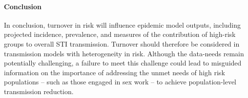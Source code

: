 \paragraph{Conclusion}
In conclusion, turnover in risk will influence
epidemic model outputs, including projected incidence, prevalence, and
measures of the contribution of high-risk groups to overall STI transmission.
Turnover should therefore be considered in
transmission models with heterogeneity in risk.
Although the data-needs remain potentially challenging,
a failure to meet this challenge
could lead to misguided information on the importance of
addressing the unmet needs of high risk populations
-- such as those engaged in sex work --
to achieve population-level transmission reduction.
